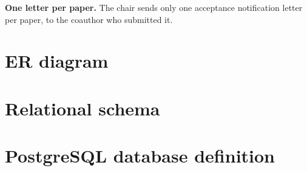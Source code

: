 \documentclass[12pt]{article}
\renewcommand{\bf}{\bfseries}
\newcommand{\<}{\langle}
\renewcommand{\>}{\rangle}
\begin{document}
{\bf One letter per paper.} The chair sends only one acceptance notification letter per paper, to the coauthor who submitted it.

\part{ER diagram}



\part{Relational schema}



\part{PostgreSQL database definition}
\end{document}

